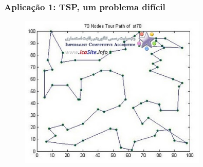\documentclass{beamer}
\begin{document}
\begin{frame}
\frametitle{Aplicação 1: TSP, um problema difícil}
\begin{figure}[ht!]
 \centering
 \includegraphics[width=0.8\textwidth , height=0.6\textheight]{figures/ant03.jpg}
\end{figure}
\end{frame}

\end{document}
